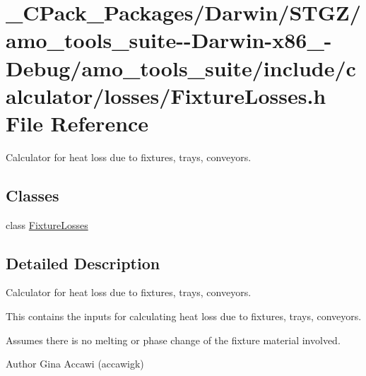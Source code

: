 \hypertarget{___c_pack___packages_2_darwin_2_s_t_g_z_2amo__tools__suite--_darwin-x86__64-_debug_2amo__tools__6f7ae12a348f2f4e7be063f73b33ce11}{}\section{\+\_\+\+C\+Pack\+\_\+\+Packages/\+Darwin/\+S\+T\+G\+Z/amo\+\_\+tools\+\_\+suite-\/-\/\+Darwin-\/x86\+\_-\/\+Debug/amo\+\_\+tools\+\_\+suite/include/calculator/losses/\+Fixture\+Losses.h File Reference}
\label{___c_pack___packages_2_darwin_2_s_t_g_z_2amo__tools__suite--_darwin-x86__64-_debug_2amo__tools__6f7ae12a348f2f4e7be063f73b33ce11}


Calculator for heat loss due to fixtures, trays, conveyors.  


\subsection*{Classes}
\begin{DoxyCompactItemize}
\item 
class \hyperlink{class_fixture_losses}{Fixture\+Losses}
\end{DoxyCompactItemize}


\subsection{Detailed Description}
Calculator for heat loss due to fixtures, trays, conveyors. 

This contains the inputs for calculating heat loss due to fixtures, trays, conveyors.

Assumes there is no melting or phase change of the fixture material involved.

\begin{DoxyAuthor}{Author}
Gina Accawi (accawigk) 
\end{DoxyAuthor}
